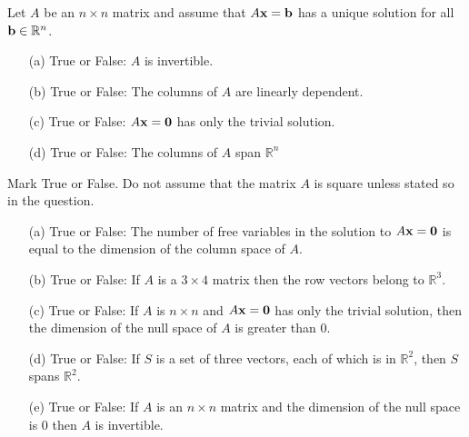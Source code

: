 \begin{problem}
    Let $A$ be an $n \times n$ matrix and assume that $A {\bf x} = {\bf b}$ has a
    unique solution for all
    ${\bf b} \in \mathbb{R}^n$.
    \begin{enumerate}
        \item[(a)] True or False: $A$ is invertible. 
        \item[(b)] True or False: The columns of $A$ are linearly dependent. 
        \item[(c)] True or False: $A {\bf x} = {\bf 0}$ has only the trivial solution.
        \item[(d)] True or False: The columns of $A$ span $\mathbb{R}^n$
    \end{enumerate}
\end{problem}
\begin{problem}
 Mark True or False.  Do not assume that the matrix $A$ is square unless stated so in the
 question. 
    \begin{enumerate}
        \item[(a)] True or False: The number of free variables in the solution to $A {\bf x} =
        {\bf 0}$ is equal to the dimension of the column space of $A$.
        \item[(b)] True or False: If $A$ is a $3 \times 4$ matrix then the row vectors belong to
        $\mathbb{R}^3$.
        \item[(c)] True or False: If $A$ is $n \times n$ and $A {\bf x} = {\bf 0}$ has only the
        trivial solution, then the dimension of the null space of $A$ is greater than 0.
        \item[(d)] True or False: If $S$ is a set of three vectors, each of which is in
        $\mathbb{R}^2$, then $S$ spans $\mathbb{R}^2$.
        \item[(e)] True or False: If $A$ is an $n \times n$ matrix and the dimension of the
        null space is 0 then $A$ is invertible.
    \end{enumerate}

\end{problem}

